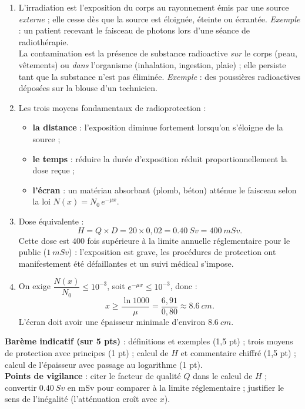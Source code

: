 \documentclass[11pt]{article}
\newcommand{\cle}[1]{{\popxbold\color{popdark}#1}}
\begin{document}
\begin{corrige}
\begin{enumerate}
\item L'\cle{irradiation} est l'exposition du corps au rayonnement émis par une source \emph{externe} ; elle cesse dès que la source est éloignée, éteinte ou écran­tée. \emph{Exemple} : un patient recevant le faisceau de photons lors d'une séance de radiothérapie.\\
La \cle{contamination} est la présence de substance radioactive \emph{sur} le corps (peau, vêtements) ou \emph{dans} l'organisme (inhalation, ingestion, plaie) ; elle persiste tant que la substance n'est pas éliminée. \emph{Exemple} : des poussières radioactives déposées sur la blouse d'un technicien.
\item Les trois moyens fondamentaux de radioprotection :
\begin{itemize}
\item \textbf{la distance} : l'exposition diminue fortement lorsqu'on s'éloigne de la source ;
\item \textbf{le temps} : réduire la durée d'exposition réduit proportionnellement la dose reçue ;
\item \textbf{l'écran} : un matériau absorbant (plomb, béton) atténue le faisceau selon la loi $N(x) = N_0\,e^{-\mu x}$.
\end{itemize}
\item Dose équivalente :
\[ H = Q \times D = 20 \times 0,02 = \SI{0,40}{Sv} = \SI{400}{mSv}. \]
Cette dose est $400$ fois supérieure à la limite annuelle réglementaire pour le public ($\SI{1}{mSv}$) : l'exposition est grave, les procédures de protection ont manifestement été défaillantes et un suivi médical s'impose.
\item On exige $\dfrac{N(x)}{N_0} \leq 10^{-3}$, soit $e^{-\mu x} \leq 10^{-3}$, donc :
\[ x \geq \frac{\ln 1000}{\mu} = \frac{6,91}{0,80} \approx \SI{8,6}{cm}. \]
L'écran doit avoir une épaisseur minimale d'environ $\SI{8,6}{cm}$.
\end{enumerate}
\textbf{Barème indicatif (sur 5 pts)} : définitions et exemples (1,5 pt) ; trois moyens de protection avec principes (1 pt) ; calcul de $H$ et commentaire chiffré (1,5 pt) ; calcul de l'épaisseur avec passage au logarithme (1 pt).\\
\textbf{Points de vigilance} : citer le facteur de qualité $Q$ dans le calcul de $H$ ; convertir $\SI{0,40}{Sv}$ en mSv pour comparer à la limite réglementaire ; justifier le sens de l'inégalité (l'atténuation croît avec $x$).
\end{corrige}
\end{document}
